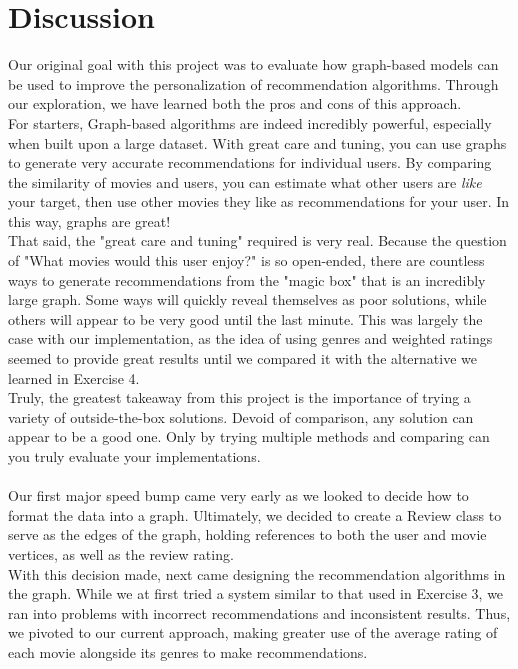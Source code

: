 \documentclass[12pt]{article}
\begin{document}
\section{Discussion}

Our original goal with this project was to evaluate how graph-based models can be used to improve the personalization of recommendation algorithms. Through our exploration, we have learned both the pros and cons of this approach. \\
For starters, Graph-based algorithms are indeed incredibly powerful, especially when built upon a large dataset. With great care and tuning, you can use graphs to generate very accurate recommendations for individual users. By comparing the similarity of movies and users, you can estimate what other users are \textit{like} your target, then use other movies they like as recommendations for your user. In this way, graphs are great! \\
That said, the "great care and tuning" required is very real. Because the question of "What movies would this user enjoy?" is so open-ended, there are countless ways to generate recommendations from the "magic box" that is an incredibly large graph. Some ways will quickly reveal themselves as poor solutions, while others will appear to be very good until the last minute. This was largely the case with our implementation, as the idea of using genres and weighted ratings seemed to provide great results until we compared it with the alternative we learned in Exercise 4. \\
Truly, the greatest takeaway from this project is the importance of trying a variety of outside-the-box solutions. Devoid of comparison, any solution can appear to be a good one. Only by trying multiple methods and comparing can you truly evaluate your implementations. \\
\\
Our first major speed bump came very early as we looked to decide how to format the data into a graph. Ultimately, we decided to create a Review class to serve as the edges of the graph, holding references to both the user and movie vertices, as well as the review rating. \\
With this decision made, next came designing the recommendation algorithms in the graph. While we at first tried a system similar to that used in Exercise 3, we ran into problems with incorrect recommendations and inconsistent results. Thus, we pivoted to our current approach, making greater use of the average rating of each movie alongside its genres to make recommendations. \\
\end{document}
